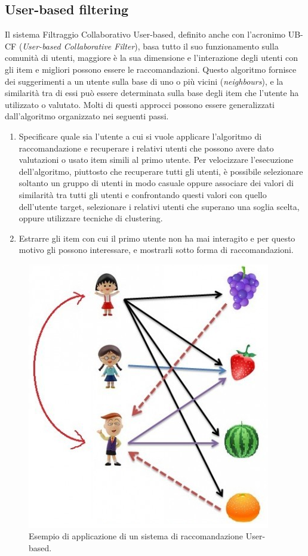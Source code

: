 \subsection{User-based filtering}
Il sistema Filtraggio Collaborativo User-based, definito anche con l'acronimo UB-CF (\textit{User-based Collaborative Filter}), basa tutto il suo 
funzionamento sulla comunità di utenti, maggiore è la sua dimensione e l'interazione degli utenti con gli item e migliori possono essere le 
raccomandazioni. Questo algoritmo fornisce dei suggerimenti a un utente sulla base di uno o più vicini (\textit{neighbours}), e la similarità 
tra di essi può essere determinata sulla base degli item che l'utente ha utilizzato o valutato.\hfill\break
Molti di questi approcci possono essere generalizzati dall'algoritmo organizzato nei seguenti passi.
\begin{enumerate}
    \item Specificare quale sia l'utente a cui si vuole applicare l'algoritmo di raccomandazione e recuperare i relativi utenti che possono 
    avere dato valutazioni o usato item simili al primo utente. Per velocizzare l'esecuzione dell'algoritmo, piuttosto che recuperare tutti 
    gli utenti, è possibile selezionare soltanto un gruppo di utenti in modo casuale oppure associare dei valori di similarità tra 
    tutti gli utenti e confrontando questi valori con quello dell'utente target, selezionare i relativi utenti che superano una soglia 
    scelta, oppure utilizzare tecniche di clustering.
    \item Estrarre gli item con cui il primo utente non ha mai interagito e per questo motivo gli possono interessare, e mostrarli 
    sotto forma di raccomandazioni.
\end{enumerate}
\begin{figure}[ht!]
    \centering
    \includegraphics[scale=0.5]{images/UB_CF_ex.png}
    \caption{Esempio di applicazione di un sistema di raccomandazione User-based.}
    \label{fig:UB_CF}
\end{figure}
